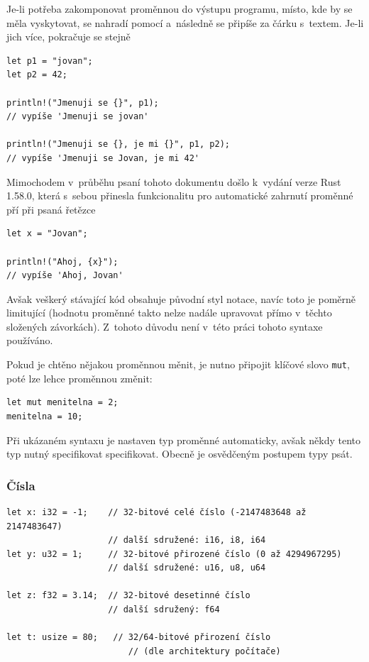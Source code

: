 \documentclass[a4paper, 12pt]{article} %
\newcommand{\rust}[1]{\texttt{#1}}
\begin{document}
        Je-li potřeba zakomponovat proměnnou do výstupu programu, místo, kde by se měla vyskytovat, se nahradí pomocí \rust{{}} a~následně se připíše za čárku s~textem. Je-li jich více, pokračuje se stejně
        \begin{verbatim}
let p1 = "jovan";
let p2 = 42;

println!("Jmenuji se {}", p1);
// vypíše 'Jmenuji se jovan'

println!("Jmenuji se {}, je mi {}", p1, p2);
// vypíše 'Jmenuji se Jovan, je mi 42'
        \end{verbatim}
        
        Mimochodem v~průběhu psaní tohoto dokumentu došlo k~vydání verze Rust 1.58.0, která s~sebou přinesla funkcionalitu pro automatické zahrnutí proměnné pří při psaná řetězce
        \begin{verbatim}
let x = "Jovan";

println!("Ahoj, {x}");
// vypíše 'Ahoj, Jovan'
        \end{verbatim}
        \cite{rustblog_ann}
        
        Avšak veškerý stávající kód obsahuje původní styl notace, navíc toto je poměrně limitující (hodnotu proměnné takto nelze nadále upravovat přímo v~těchto složených závorkách). Z~tohoto důvodu není v~této práci tohoto syntaxe používáno.
        
        Pokud je chtěno nějakou proměnnou měnit, je nutno připojit klíčové slovo \rust{mut}, poté lze lehce proměnnou změnit:
        \begin{verbatim}
let mut menitelna = 2;
menitelna = 10;
        \end{verbatim}

        Při ukázaném syntaxu je nastaven typ proměnné automaticky, avšak někdy tento typ nutný specifikovat specifikovat. Obecně je osvědčeným postupem typy psát.


        \subsubsection*{Čísla}
            \begin{verbatim}
let x: i32 = -1;    // 32-bitové celé číslo (-2147483648 až 2147483647)
                    // další sdružené: i16, i8, i64
let y: u32 = 1;     // 32-bitové přirozené číslo (0 až 4294967295)
                    // další sdružené: u16, u8, u64                

let z: f32 = 3.14;  // 32-bitové desetinné číslo 
                    // další sdružený: f64

let t: usize = 80;   // 32/64-bitové přirození číslo
                        // (dle architektury počítače)
            \end{verbatim}
\end{document}

